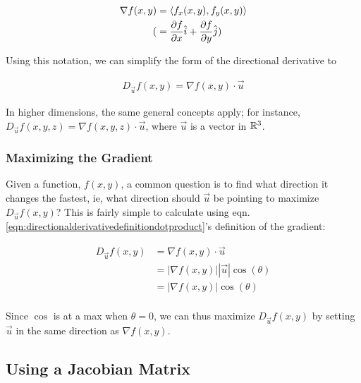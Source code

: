 \documentclass[12pt]{article}
\begin{document}
\begin{equation}
    \begin{split}
        \nabla f(x,y) &= \left\langle f_x(x,y), f_y(x,y) \right\rangle\\
        (&= \frac{\partial f}{\partial x}\hat{i} +\frac{\partial f}{\partial y}\hat{j} )
    \end{split}
\end{equation}

Using this notation, we can simplify the form of the directional derivative to 

\begin{equation}\label{eqn:directionalderivativedefinitiondotproduct}
    \begin{split}
        D_{\vec{u}}f(x,y) = \nabla f(x,y) \cdot \vec{u}
    \end{split}
\end{equation}

In higher dimensions, the same general concepts apply; for instance, $D_{\vec{u}}f(x,y,z) = \nabla f(x,y,z) \cdot \vec{u}$, where $\vec{u}$ is a vector in $\mathbb{R}^3$.

\subsubsection{Maximizing the Gradient}

Given a function, $f(x,y)$, a common question is to find what direction it changes the fastest, ie, what direction should $\vec{u}$ be pointing to maximize $D_{\vec{u}}f(x,y)$? This is fairly simple to calculate using eqn. \ref{eqn:directionalderivativedefinitiondotproduct}'s definition of the gradient:

\begin{equation}
    \begin{split}
        D_{\vec{u}} f(x,y) &= \nabla f(x,y) \cdot \vec{u}\\
        &= |\nabla f(x,y)| |\vec{u}| \cos(\theta)\\
        &= |\nabla f(x,y)| \cos(\theta)\\
    \end{split}
\end{equation}

Since $\cos$ is at a max when $\theta = 0$, we can thus maximize $D_{\vec{u}} f(x,y)$ by setting $\vec{u}$ in the same direction as $\nabla f(x,y)$.

\subsection{Using a Jacobian Matrix}
\end{document}
